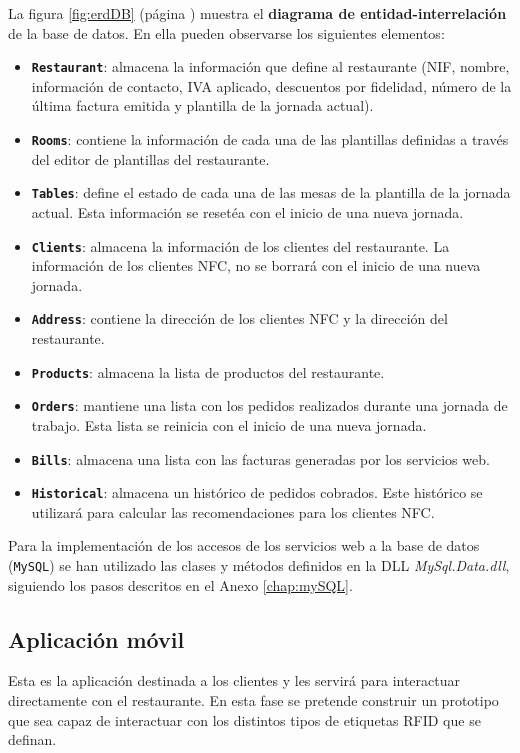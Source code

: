 La figura \ref{fig:erdDB} (página \pageref{fig:erdDB}) muestra el
\textbf{diagrama de entidad-interrelación} de la base de datos. En ella pueden 
observarse los siguientes elementos:
\begin{itemize}
\item \textbf{\texttt{Restaurant}}: almacena la información que define al 
restaurante (NIF, nombre, información de contacto, IVA aplicado, descuentos por 
fidelidad, número de la última factura emitida y plantilla de la jornada 
actual).
\item \textbf{\texttt{Rooms}}: contiene la información de cada una de las 
plantillas definidas a través del editor de plantillas del restaurante.
\item \textbf{\texttt{Tables}}: define el estado de cada una de las mesas de la
plantilla de la jornada actual. Esta información se resetéa con el inicio
de una nueva jornada.
\item \textbf{\texttt{Clients}}: almacena la información de los clientes del
restaurante. La información de los clientes \acs{NFC}, no se borrará con el
inicio de una nueva jornada.
\item \textbf{\texttt{Address}}: contiene la dirección de los clientes
\acs{NFC} y la dirección del restaurante.
\item \textbf{\texttt{Products}}: almacena la lista de productos del 
restaurante.
\item \textbf{\texttt{Orders}}: mantiene una lista con los pedidos realizados 
durante una jornada de trabajo. Esta lista se reinicia con el inicio de una 
nueva jornada.
\item \textbf{\texttt{Bills}}: almacena una lista con las facturas generadas 
por los servicios web.
\item \textbf{\texttt{Historical}}: almacena un histórico de pedidos cobrados. 
Este histórico se utilizará para calcular las recomendaciones para los clientes
\acs{NFC}.
\end{itemize}

Para la implementación de los accesos de los servicios web a la base de datos 
(\texttt{MySQL}) se han utilizado las clases y métodos definidos en la \acs{DLL}
\emph{MySql.Data.dll}, siguiendo los pasos descritos en el Anexo
\ref{chap:mySQL}.

\subsection{Aplicación móvil}
Esta es la aplicación destinada a los clientes y les servirá para interactuar
directamente con el restaurante. En esta fase se pretende construir un
prototipo que sea capaz de interactuar con los distintos
tipos de etiquetas \acs{RFID} que se definan.


